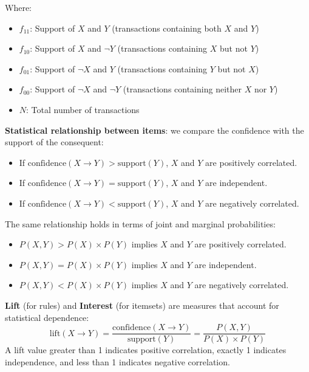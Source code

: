 Where:
\begin{itemize}
    \item $f_{11}$: Support of $X$ and $Y$ (transactions containing both $X$ and $Y$)
    \item $f_{10}$: Support of $X$ and $\neg Y$ (transactions containing $X$ but not $Y$)
    \item $f_{01}$: Support of $\neg X$ and $Y$ (transactions containing $Y$ but not $X$)
    \item $f_{00}$: Support of $\neg X$ and $\neg Y$ (transactions containing neither $X$ nor $Y$)
    \item $N$: Total number of transactions
\end{itemize}

\textbf{Statistical relationship between items}: we compare the confidence with the support of the consequent:
\begin{itemize}
    \item If $\text{confidence}(X \rightarrow Y) > \text{support}(Y)$, $X$ and $Y$ are positively correlated.
    \item If $\text{confidence}(X \rightarrow Y) = \text{support}(Y)$, $X$ and $Y$ are independent.
    \item If $\text{confidence}(X \rightarrow Y) < \text{support}(Y)$, $X$ and $Y$ are negatively correlated.
\end{itemize}

The same relationship holds in terms of joint and marginal probabilities:
\begin{itemize}
    \item $P(X,Y) > P(X) \times P(Y)$ implies $X$ and $Y$ are positively correlated.
    \item $P(X,Y) = P(X) \times P(Y)$ implies $X$ and $Y$ are independent.
    \item $P(X,Y) < P(X) \times P(Y)$ implies $X$ and $Y$ are negatively correlated.
\end{itemize}

\begin{definition}
\textbf{Lift} (for rules) and \textbf{Interest} (for itemsets) are measures that account for statistical dependence:
\[
\text{lift}(X \rightarrow Y) = \frac{\text{confidence}(X \rightarrow Y)}{\text{support}(Y)} = \frac{P(X,Y)}{P(X) \times P(Y)}
\]
A lift value greater than 1 indicates positive correlation, exactly 1 indicates independence, and less than 1 indicates negative correlation.
\end{definition}

